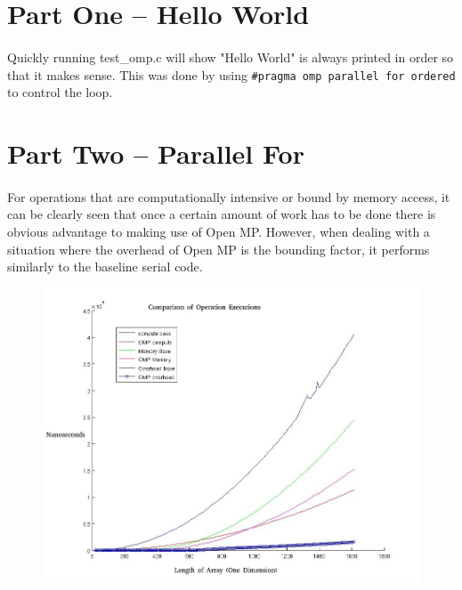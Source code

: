\documentclass[12pt,8.5in,11in]{article}
\begin{document}
	\maketitle
	
\section{Part One -- Hello World}

\paragraph{}
Quickly running test\_omp.c will show "Hello World" is always printed in order so that it makes sense.  This was done by using \texttt{\#pragma omp parallel for ordered} to control the loop.

\section{Part Two -- Parallel For}

\paragraph{}
For operations that are computationally intensive or bound by memory access, it can be clearly seen that once a certain amount of work has to be done there is obvious advantage to making use of Open MP.  However, when dealing with a situation where the overhead of Open MP is the bounding factor, it performs similarly to the baseline serial code.

\begin{figure}[h!]
	\centering
	\includegraphics[scale=0.3]{part2}
\end{figure}
\end{document}
